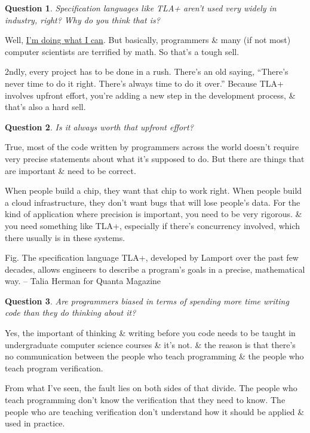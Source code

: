 \documentclass[oneside]{book}
\numberwithin{equation}{section}
\newtheorem{question}{Question}[chapter]
\begin{document}
\begin{question}
	Specification languages like TLA+ aren't used very widely in industry, right? Why do you think that is?
\end{question}
Well, \href{https://www.youtube.com/channel/UCajiu4Cj_GHOX0if3Up-eRA}{I'm doing what I can}. But basically, programmers \& many (if not most) computer scientists are terrified by math. So that's a tough sell.

2ndly, every project has to be done in a rush. There's an old saying, ``There's never time to do it right. There's always time to do it over.'' Because TLA+ involves upfront effort, you're adding a new step in the development process, \& that's also a hard sell.

\begin{question}
	Is it always worth that upfront effort?
\end{question}
True, most of the code written by programmers across the world doesn't require very precise statements about what it's supposed to do. But there are things that are important \& need to be correct.

When people build a chip, they want that chip to work right. When people build a cloud infrastructure, they don't want bugs that will lose people's data. For the kind of application where precision is important, you need to be very rigorous. \& you need something like TLA+, especially if there's concurrency involved, which there usually is in these systems.

\textsf{Fig. The specification language TLA+, developed by Lamport over the past few decades, allows engineers to describe a program's goals in a precise, mathematical way.} -- Talia Herman for Quanta Magazine

\begin{question}
	Are programmers biased in terms of spending more time writing code than they do thinking about it?
\end{question}
Yes, the important of thinking \& writing before you code needs to be taught in undergraduate computer science courses \& it's not. \& the reason is that there's no communication between the people who teach programming \& the people who teach program verification.

From what I've seen, the fault lies on both sides of that divide. The people who teach programming don't know the verification that they need to know. The people who are teaching verification don't understand how it should be applied \& used in practice.
\end{document}

